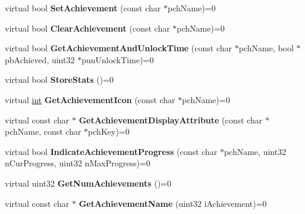 \begin{DoxyCompactItemize}
\item 
\hypertarget{classISteamUserStats_adb1050d4a2dec1b3d746ae5d26cb9db5}{}virtual bool {\bfseries Set\+Achievement} (const char $\ast$pch\+Name)=0\label{classISteamUserStats_adb1050d4a2dec1b3d746ae5d26cb9db5}

\item 
\hypertarget{classISteamUserStats_ae187d50ec8b6730932234f4739b57326}{}virtual bool {\bfseries Clear\+Achievement} (const char $\ast$pch\+Name)=0\label{classISteamUserStats_ae187d50ec8b6730932234f4739b57326}

\item 
\hypertarget{classISteamUserStats_a28ea2e320d99ef2df4c8ff3969ca2612}{}virtual bool {\bfseries Get\+Achievement\+And\+Unlock\+Time} (const char $\ast$pch\+Name, bool $\ast$pb\+Achieved, uint32 $\ast$pun\+Unlock\+Time)=0\label{classISteamUserStats_a28ea2e320d99ef2df4c8ff3969ca2612}

\item 
\hypertarget{classISteamUserStats_af80aba36654117e952c1b5507b0865b0}{}virtual bool {\bfseries Store\+Stats} ()=0\label{classISteamUserStats_af80aba36654117e952c1b5507b0865b0}

\item 
\hypertarget{classISteamUserStats_abfd345e6efbd85b068074f535a32a58e}{}virtual \hyperlink{SDL__thread_8h_a6a64f9be4433e4de6e2f2f548cf3c08e}{int} {\bfseries Get\+Achievement\+Icon} (const char $\ast$pch\+Name)=0\label{classISteamUserStats_abfd345e6efbd85b068074f535a32a58e}

\item 
\hypertarget{classISteamUserStats_a2c29d874a3cb979f6e8c4fc237b03ceb}{}virtual const char $\ast$ {\bfseries Get\+Achievement\+Display\+Attribute} (const char $\ast$pch\+Name, const char $\ast$pch\+Key)=0\label{classISteamUserStats_a2c29d874a3cb979f6e8c4fc237b03ceb}

\item 
\hypertarget{classISteamUserStats_af03a0d67c7b14e664701eb83bbc8552e}{}virtual bool {\bfseries Indicate\+Achievement\+Progress} (const char $\ast$pch\+Name, uint32 n\+Cur\+Progress, uint32 n\+Max\+Progress)=0\label{classISteamUserStats_af03a0d67c7b14e664701eb83bbc8552e}

\item 
\hypertarget{classISteamUserStats_a61cf7dd5f4d80fbb278b68211613d732}{}virtual uint32 {\bfseries Get\+Num\+Achievements} ()=0\label{classISteamUserStats_a61cf7dd5f4d80fbb278b68211613d732}

\item 
\hypertarget{classISteamUserStats_a1a9245175aadab7ee2564502b0ab5282}{}virtual const char $\ast$ {\bfseries Get\+Achievement\+Name} (uint32 i\+Achievement)=0\label{classISteamUserStats_a1a9245175aadab7ee2564502b0ab5282}


\end{DoxyCompactItemize}
